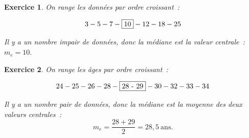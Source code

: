 \documentclass[10pt]{article}
\newtheorem{exo}{Exercice}
\begin{document}
\begin{exo}

On range les données par ordre croissant~:

\[ 3 - 5 - 7 - \fbox{10} - 12 - 18 - 25\]

Il y a un nombre impair de données, donc la médiane est la valeur centrale~: $m_e=10.$



\end{exo}


\begin{exo}

On range les âges par ordre croissant~:

\[24 -25 - 26 - 28 - \fbox{28 - 29} - 30 - 32 - 33 - 34\]

Il y a un nombre pair de données, donc la médiane est la moyenne des deux valeurs centrales~:
\[m_e=\frac{28+29}{2}=28,5~\text{ans}.\]


\end{exo}
\end{document}
